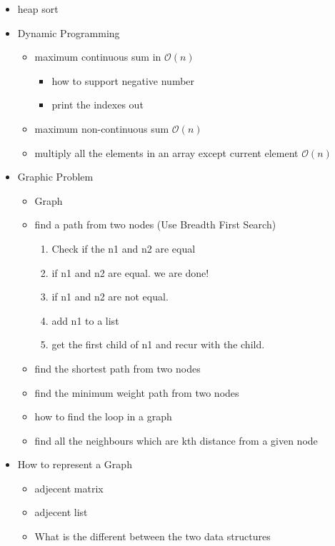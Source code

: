 \documentclass{article}
\begin{document}
\begin{enumerate}
\begin{itemize}
\item heap sort
\item Dynamic Programming
    \begin{itemize}
     \item maximum continuous sum in $\mathcal{O}(n)$ 
     \begin{itemize}
     \item how to support negative number
     \item print the indexes out 
     \end{itemize}
     \item maximum non-continuous sum $\mathcal{O}(n)$ 
     \item multiply all the elements in an array except current element $\mathcal{O}(n)$ 

    \end{itemize}

\item Graphic Problem
\begin{itemize}
 \item Graph
 \item find a path from two nodes (Use Breadth First Search)
 \begin{enumerate}
  \item Check if the n1 and n2 are equal 
  \item if n1 and n2 are equal. we are done!
  \item if n1 and n2 are not equal. 
  \item add n1 to a list
  \item get the first child of n1 and recur with the child.
 \end{enumerate}

 \item find the shortest path from two nodes
 \item find the minimum weight path from two nodes
 \item how to find the loop in a graph
 \item find all the neighbours which are kth distance from a given node
\end{itemize}

\item How to represent a Graph
\begin{itemize}
 \item adjecent matrix 
 \item adjecent list
 \item What is the different between the two data structures
\end{itemize}


\end{itemize}
\end{enumerate}
\end{document}
